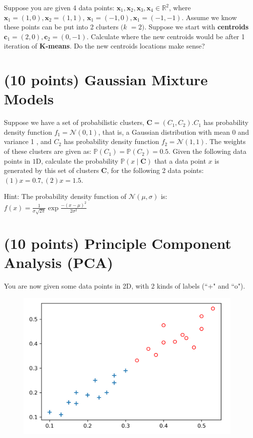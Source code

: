 \documentclass[12pt]{article}%
\begin{document}
Suppose you are given 4 data points: $\mathbf{x}_{1}, \mathbf{x}_{2}, \mathbf{x}_{3}, \mathbf{x}_{4} \in \mathbb{R}^{2}$, where $\mathbf{x}_{1}=(1,0), \mathbf{x}_{2}=(1,1)$, $\mathbf{x}_{1}=(-1,0), \mathbf{x}_{1}=(-1,-1)$. Assume we know these points can be put into 2 clusters $(k$ $=2)$. Suppose we start with \textbf{centroids} $\mathbf{c}_{1}=(2,0), \mathbf{c}_{2}=(0,-1)$. Calculate where the new centroids would be after 1 iteration of \textbf{K-means}. Do the new centroids locations make sense?

\newpage


\section{(10 points) Gaussian Mixture Models}

Suppose we have a set of probabilistic clusters, $\mathbf{C}=\left(C_{1}, C_{2}\right) . C_{1}$ has probability density function $f_{1}=\mathcal{N}(0,1)$, that is, a Gaussian distribution with mean 0 and variance 1 , and $C_{2}$ has probability density function $f_{2}=\mathcal{N}(1,1)$. The weights of these clusters are given as: $\mathbb{P}\left(C_{1}\right)=\mathbb{P}\left(C_{2}\right)=0.5$. Given the following data points in $1 \mathrm{D}$, calculate the probability $\mathbb{P}(x \mid \mathbf{C})$ that a data point $x$ is generated by this set of clusters $\mathbf{C}$, for the following 2 data points: $(1) x=0.7,(2) x=1.5$.

Hint: The probability density function of $\mathcal{N}(\mu, \sigma)$ is: $f(x)=\frac{1}{\sigma \sqrt{2 \pi}} \exp \frac{-(x-\mu)^{2}}{2 \sigma^{2}}$

\newpage

\section{(10 points) Principle Component Analysis (PCA)}

You are now given some data points in 2D, with 2 kinds of labels (``+" and ``o").

\begin{figure}[h]
    \centering
    \includegraphics[width=0.6\linewidth]{fig.png}
\end{figure}
\end{document}
